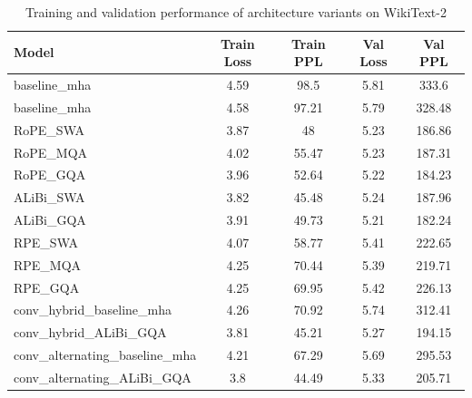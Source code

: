 \documentclass[10pt]{article}
\theoremstyle{plain}
\begin{document}
  \begin{table}[H]
  \centering
\caption{Training and validation performance of architecture variants on WikiText-2}
\label{tab:core_ml_results_perf}
\begin{tabular}{lcccc}
\toprule
Model & Train Loss & Train PPL & Val Loss & Val PPL \\
\midrule
baseline\_mha & 4.59 & 98.5 & 5.81 & 333.6 \\
baseline\_mha & 4.58 & 97.21 & 5.79 & 328.48 \\
RoPE\_SWA & 3.87 & 48 & 5.23 & 186.86 \\
RoPE\_MQA & 4.02 & 55.47 & 5.23 & 187.31 \\
RoPE\_GQA & 3.96 & 52.64 & 5.22 & 184.23 \\
ALiBi\_SWA & 3.82 & 45.48 & 5.24 & 187.96 \\
ALiBi\_GQA & 3.91 & 49.73 & 5.21 & 182.24 \\
RPE\_SWA & 4.07 & 58.77 & 5.41 & 222.65 \\
RPE\_MQA & 4.25 & 70.44 & 5.39 & 219.71 \\
RPE\_GQA & 4.25 & 69.95 & 5.42 & 226.13 \\
conv\_hybrid\_baseline\_mha & 4.26 & 70.92 & 5.74 & 312.41 \\
conv\_hybrid\_ALiBi\_GQA & 3.81 & 45.21 & 5.27 & 194.15 \\
conv\_alternating\_baseline\_mha & 4.21 & 67.29 & 5.69 & 295.53 \\
conv\_alternating\_ALiBi\_GQA & 3.8 & 44.49 & 5.33 & 205.71 \\
\bottomrule
\end{tabular}
\end{table}
\end{document}
